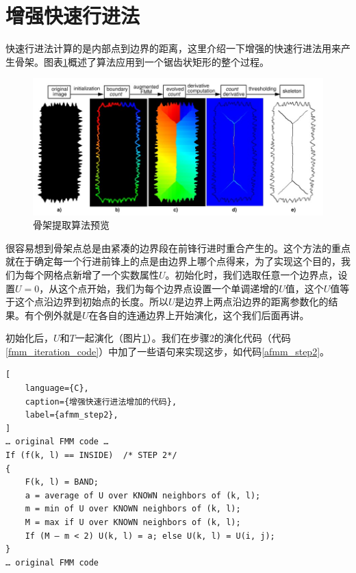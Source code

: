 \section{增强快速行进法}
\label{section-afmm}
快速行进法计算的是内部点到边界的距离，这里介绍一下增强的快速行进法用来产生骨架。图表\ref{skel_overview}概述了算法应用到一个锯齿状矩形的整个过程。
\begin{figure}[h!]
    \centering
    \includegraphics[height=200bp]{figure/skel_overview.png}
    \caption{骨架提取算法预览}
    \label{skel_overview}
\end{figure}
很容易想到骨架点总是由紧凑的边界段在前锋行进时重合产生的。这个方法的重点就在于确定每一个行进前锋上的点是由边界上哪个点得来，为了实现这个目的，我们为每个网格点新增了一个实数属性$U$。初始化时，我们选取任意一个边界点，设置$U=0$，从这个点开始，我们为每个边界点设置一个单调递增的$U$值，这个$U$值等于这个点沿边界到初始点的长度。所以$U$是边界上两点沿边界的距离参数化的结果。有个例外就是$U$在各自的连通边界上开始演化，这个我们后面再讲。

初始化后，$U$和$T$一起演化（图片\ref{skel_overview}）。我们在步骤2的演化代码（代码\ref{fmm_iteration_code}）中加了一些语句来实现这步，如代码\ref{afmm_step2}。
\begin{lstlisting}[
    language={C},
    caption={增强快速行进法增加的代码},
    label={afmm_step2},
]
… original FMM code …
If (f(k, l) == INSIDE)	/* STEP 2*/
{
	F(k, l) = BAND;
	a = average of U over KNOWN neighbors of (k, l);
	m = min of U over KNOWN neighbors of (k, l);
	M = max if U over KNOWN neighbors of (k, l);
	If (M – m < 2) U(k, l) = a; else U(k, l) = U(i, j);
}
… original FMM code
\end{lstlisting}

